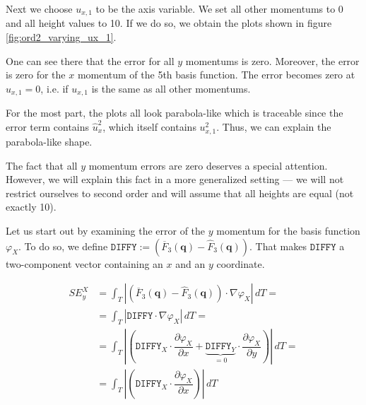 \documentclass{article}
\newcommand{\pd}[2]{\dfrac{\partial #1}{\partial #2}}
\renewcommand{\phi}{\varphi}
\begin{document}
Next we choose $u_{x,1}$ to be the axis variable. We set all other momentums to 0 and all height values to 10. If we do so, we obtain the plots shown in figure \ref{fig:ord2_varying_ux_1}.



One can see there that the error for all $y$ momentums is zero. Moreover, the error is zero for the $x$ momentum of the 5th basis function. The error becomes zero at $u_{x,1}=0$, i.e. if $u_{x,1}$ is the same as all other momentums.

For the most part, the plots all look parabola-like which is traceable since the error term contains $\widehat{u}_x^2$, which itself contains $u_{x,1}^2$. Thus, we can explain the parabola-like shape.

The fact that all $y$ momentum errors are zero deserves a special attention. However, we will explain this fact in a more generalized setting --- we will not restrict ourselves to second order and will assume that all heights are equal (not exactly 10).



Let us start out by examining the error of the $y$ momentum for the basis function $\phi_X$. To do so, we define $\mathtt{DIFFY}:=\left( \overline{F}_3(\mathbf{q}) - \widehat{F}_3(\mathbf{q}) \right)$. That makes $\mathtt{DIFFY}$ a two-component vector containing an $x$ and an $y$ coordinate.

\begin{align*}
  SE_y^X &= \int_T \left| \left( \overline{F}_3(\mathbf{q}) - \widehat{F}_3(\mathbf{q}) \right) \cdot \nabla \phi_X \right| \, dT = \\
  &= \int_T \left| \mathtt{DIFFY} \cdot \nabla \phi_X \right|\,dT = \\
  &= \int_T \left| \left( \mathtt{DIFFY}_X \cdot \pd{\phi_X}{x} + \underbrace{\mathtt{DIFFY}_Y}_{=0} \cdot \pd{\phi_X}{y} \right) \right| \, dT = \\
  &=\int_T \left| \left( \mathtt{DIFFY}_X \cdot \pd{\phi_X}{x} \right) \right| \, dT
\end{align*}
\end{document}
